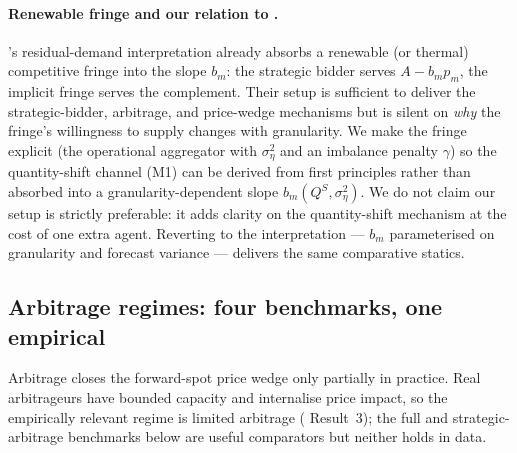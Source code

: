 \documentclass[11pt]{article}
\begin{document}
\paragraph{Renewable fringe and our relation to \citeauthor{ito_reguant_2016}.} \citeauthor{ito_reguant_2016}'s residual-demand interpretation already absorbs a renewable (or thermal) competitive fringe into the slope $b_m$: the strategic bidder serves $A - b_m p_m$, the implicit fringe serves the complement. Their setup is sufficient to deliver the strategic-bidder, arbitrage, and price-wedge mechanisms but is silent on \emph{why} the fringe's willingness to supply changes with granularity. We make the fringe explicit (the operational aggregator with $\sigma_\eta^2$ and an imbalance penalty $\gamma$) so the quantity-shift channel (M1) can be derived from first principles rather than absorbed into a granularity-dependent slope $b_m(Q^S, \sigma_\eta^2)$. We do not claim our setup is strictly preferable: it adds clarity on the quantity-shift mechanism at the cost of one extra agent. Reverting to the \citeauthor{ito_reguant_2016} interpretation --- $b_m$ parameterised on granularity and forecast variance --- delivers the same comparative statics.

\subsection{Arbitrage regimes: four benchmarks, one empirical}\label{sec:arbitrage}

Arbitrage closes the forward-spot price wedge only partially in practice. Real arbitrageurs have bounded capacity and internalise price impact, so the empirically relevant regime is limited arbitrage (\citeauthor{ito_reguant_2016} Result~3); the full and strategic-arbitrage benchmarks below are useful comparators but neither holds in data.
\end{document}
